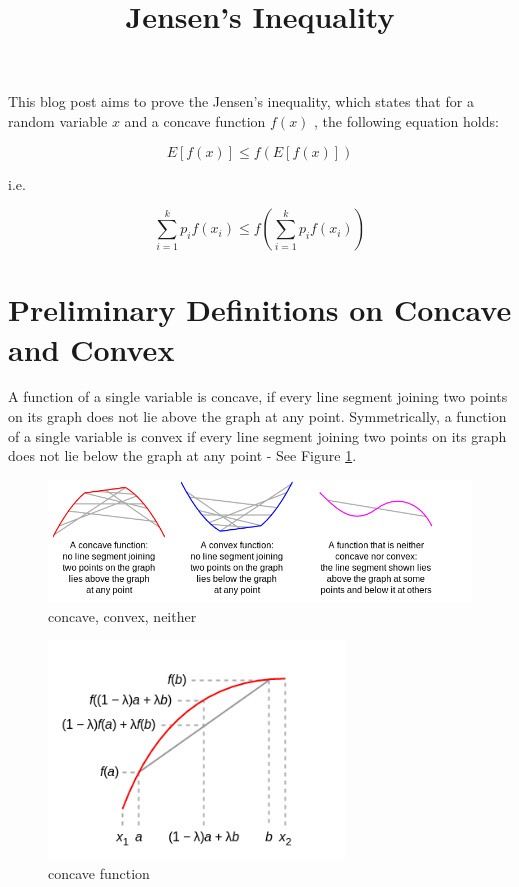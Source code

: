 \documentclass[11pt]{article}
\title{\textbf{Jensen's Inequality}}
\date{}
\begin{document}
\maketitle

This blog post aims to prove the Jensen's inequality, which states that for a random variable $x$ and a concave function $f(x)$ , the following equation holds: 

\begin{equation}
E[f(x)] \leq f(E[f(x)]) 
\end{equation}

i.e.

\begin{equation}
\sum_{i=1}^k p_{i} f(x_{i}) \leq f(\sum_{i=1}^k p_{i} f(x_{i})) 
\end{equation}

\section{Preliminary Definitions on Concave and Convex}

A function of a single variable is concave, if every line segment joining two points on its graph does not lie above the graph at any point. Symmetrically, a function of a single variable is convex if every line segment joining two points on its graph does not lie below the graph at any point - See Figure \ref{fig:concave_convex_neither}. \\

\begin{figure} \label{fig:concave_convex_neither}
\centering
\includegraphics[width=\textwidth]{img/concave_convex_neither.png}
\caption{concave, convex, neither}
\end{figure}

\begin{figure} \label{fig:concave}
\centering
\includegraphics[width=0.7\textwidth]{img/concave.png}
\caption{concave function}
\end{figure}
\end{document}
